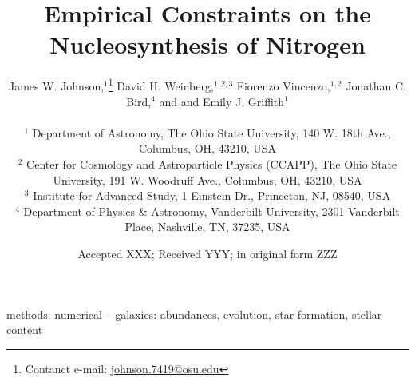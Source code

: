 \documentclass[fleqn, usenatbib]{mnras}
\title[Empirical Constraints on the Nucleosynthesis of Nitrogen]{Empirical
Constraints on the Nucleosynthesis of Nitrogen}
\author[J.W. Johnson et al.]{James W. Johnson,$^{1}$\thanks{
	Contanct e-mail: \href{mailto:
	johnson.7419@osu.edu}{johnson.7419@osu.edu}}
	David H. Weinberg,$^{1, 2, 3}$
	Fiorenzo Vincenzo,$^{1, 2}$
	Jonathan C. Bird,$^{4}$ and
	\newauthor
	and Emily J. Griffith$^{1}$
	\\ \null \\
	$^{1}$ Department of Astronomy, The Ohio State University,
	140 W. 18th Ave., Columbus, OH, 43210, USA
	\\
	$^{2}$ Center for Cosmology and Astroparticle Physics (CCAPP),
	The Ohio State University, 191 W. Woodruff Ave., Columbus, OH, 43210, USA
	\\
	$^{3}$ Institute for Advanced Study, 1 Einstein Dr., Princeton, NJ, 08540,
	USA
	\\
	$^{4}$ Department of Physics \& Astronomy, Vanderbilt University,
	2301 Vanderbilt Place, Nashville, TN, 37235, USA
}
\date{Accepted XXX; Received YYY; in original form ZZZ}
\begin{document}
\label{firstpage}
\pagerange{\pageref{firstpage}--\pageref{lastpage}}
\maketitle



\begin{keywords}
methods: numerical -- galaxies: abundances, evolution, star formation, stellar
content
\end{keywords}








\begin{appendices}

\end{appendices}

\label{lastpage}
\end{document}
